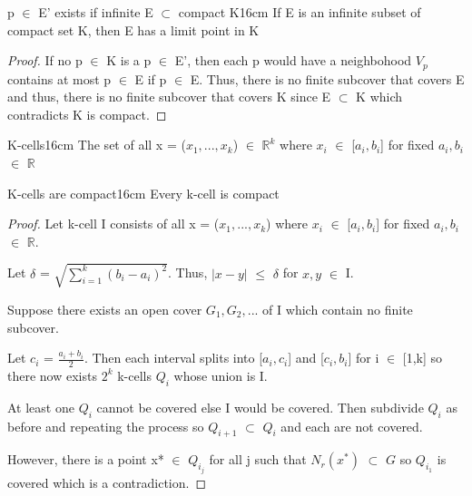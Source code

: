 	\vspace{0.5cm}



	\begin{wtheorem}{p $\in$ E' exists if
	infinite E $\subset$ compact K}{16cm}
		If E is an infinite subset of compact set K, then E has a
		limit point in K
	\end{wtheorem}
	
	\begin{proof}
		If no p $\in$ K is a p $\in$ E', then each p would have
		a neighbohood $V_p$ contains at most p $\in$ E if p $\in$ E.
		Thus, there is no finite subcover that covers E and thus,
		there is no finite subcover that covers K since E $\subset$ K
		which contradicts K is compact.
	\end{proof}

	\vspace{0.5cm}


	 
	\begin{definition}{K-cells}{16cm}
		The set of all x = ($x_1, ... , x_k$) $\in$ $\mathbb{R}^k$
		where $x_i$ $\in$ [$a_i,b_i$] for fixed $a_i,b_i$ $\in$ $\mathbb{R}$ 
	\end{definition}
	
	\vspace{0.5cm}



	\begin{wtheorem}{K-cells are compact}{16cm}
		Every k-cell is compact
	\end{wtheorem}
	
	\begin{proof}
		Let k-cell I consists of all x = ($x_1, ... , x_k$) where
		$x_i$ $\in$ [$a_i,b_i$] for fixed $a_i,b_i$ $\in$ $\mathbb{R}$.

		Let $\delta$ = $\sqrt{\sum_{i=1}^{k} (b_i - a_i)^2}$.
		Thus, $|x-y|$ $\leq$ $\delta$ for $x,y$ $\in$ I.

		Suppose there exists an open cover $G_1, G_2, ...$ of I which
		contain no finite subcover.

		Let $c_i$ = $\frac{a_i+b_i}{2}$.
		Then each interval splits into [$a_i,c_i$] and [$c_i,b_i$]
		for i $\in$ [1,k] so there now exists $2^k$ k-cells $Q_i$
		whose union is I.

		At least one $Q_i$ cannot be covered else I would be covered.
		Then subdivide $Q_i$ as before and repeating the process
		so $Q_{i+1}$ $\subset$ $Q_i$ and each are not covered.

		However, there is a point x* $\in$ $Q_{i_j}$ for all j
		such that $N_r(x^*)$ $\subset$ $G$ so $Q_{i_1}$ is covered
		which is a contradiction.
	\end{proof}

